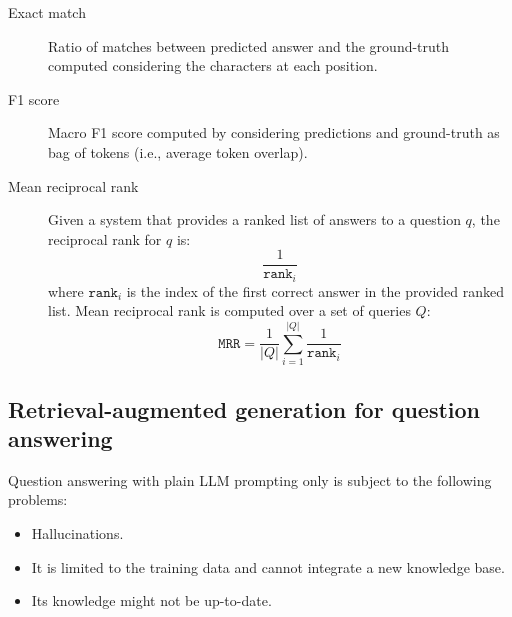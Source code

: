 \begin{description}
    \item[Exact match] 
        Ratio of matches between predicted answer and the ground-truth computed considering the characters at each position.

    \item[F1 score] 
        Macro F1 score computed by considering predictions and ground-truth as bag of tokens (i.e., average token overlap).

    \item[Mean reciprocal rank] 
        Given a system that provides a ranked list of answers to a question $q$, the reciprocal rank for $q$ is:
        \[ \frac{1}{\texttt{rank}_i} \]
        where $\texttt{rank}_i$ is the index of the first correct answer in the provided ranked list.
        Mean reciprocal rank is computed over a set of queries $Q$:
        \[ \texttt{MRR} = \frac{1}{|Q|} \sum_{i=1}^{|Q|} \frac{1}{\texttt{rank}_i} \]

\end{description}


\subsection{Retrieval-augmented generation for question answering}

\begin{remark}
    Question answering with plain LLM prompting only is subject to the following problems:
    \begin{itemize}
        \item Hallucinations.
        \item It is limited to the training data and cannot integrate a new knowledge base.
        \item Its knowledge might not be up-to-date.
    \end{itemize}
\end{remark}

